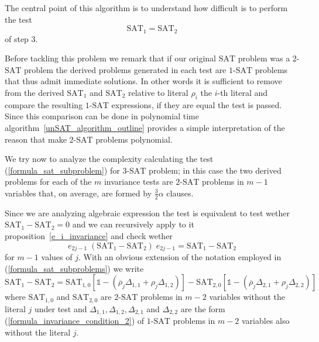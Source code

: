 \documentclass[a4paper,twoside,11pt]{article}
\begin{document}
The central point of this algorithm is to understand how difficult is to perform the test
\begin{equation}
\label{formula_sat_subproblem}
{\ensuremath{\mbox{SAT}}}_1 = {\ensuremath{\mbox{SAT}}}_2
\end{equation}
of step 3.

Before tackling this problem we remark that if our original {\ensuremath{\mbox{SAT}}}{} problem was a $2$-{\ensuremath{\mbox{SAT}}}{} problem the derived problems generated in each test are $1$-{\ensuremath{\mbox{SAT}}}{} problems that thus admit immediate solutions. In other words it is sufficient to remove from the derived ${\ensuremath{\mbox{SAT}}}_1$ and ${\ensuremath{\mbox{SAT}}}_2$ relative to literal ${\ensuremath{\rho}}_i$ the $i$-th literal and compare the resulting $1$-{\ensuremath{\mbox{SAT}}}{} expressions, if they are equal the test is passed. Since this comparison can be done in polynomial time algorithm~\ref{unSAT_algorithm_outline} provides a simple interpretation of the reason that make $2$-{\ensuremath{\mbox{SAT}}}{} problems polynomial.

\bigskip

We try now to analyze the complexity calculating the test (\ref{formula_sat_subproblem}) for $3$-{\ensuremath{\mbox{SAT}}}{} problem; in this case the two derived problems for each of the $m$ invariance tests are $2$-{\ensuremath{\mbox{SAT}}}{} problems in $m - 1$ variables that, on average, are formed by $\frac{3}{2} \alpha$ clauses.

Since we are analyzing algebraic expression the test is equivalent to test wether ${\ensuremath{\mbox{SAT}}}_1 - {\ensuremath{\mbox{SAT}}}_2 = 0$ and we can recursively apply to it proposition~\ref{e_i_invariance} and check wether
$$
{e}_{2 j - 1} \; ({\ensuremath{\mbox{SAT}}}_1 - {\ensuremath{\mbox{SAT}}}_2) \; {e}_{2 j - 1} = {\ensuremath{\mbox{SAT}}}_1 - {\ensuremath{\mbox{SAT}}}_2
$$
for $m - 1$ values of $j$. With an obvious extension of the notation employed in (\ref{formula_sat_subproblems}) we write
\begin{equation}
\label{formula_reduced_1}
{\ensuremath{\mbox{SAT}}}_1 - {\ensuremath{\mbox{SAT}}}_2 = {\ensuremath{\mbox{SAT}}}_{1,0} \left[{\ensuremath{\mathbb{1}}} - ({\overline{\ensuremath{\rho}}}_j \Delta_{1,1} + {\ensuremath{\rho}}_j \Delta_{1,2})\right] -  {\ensuremath{\mbox{SAT}}}_{2,0} \left[{\ensuremath{\mathbb{1}}} - ({\overline{\ensuremath{\rho}}}_j \Delta_{2,1} + {\ensuremath{\rho}}_j \Delta_{2,2})\right]
\end{equation}
where ${\ensuremath{\mbox{SAT}}}_{1,0}$ and ${\ensuremath{\mbox{SAT}}}_{2,0}$ are $2$-{\ensuremath{\mbox{SAT}}}{} problems in $m-2$ variables without the literal $j$ under test and $\Delta_{1,1}, \Delta_{1,2}, \Delta_{2,1}$ and $\Delta_{2,2}$ are the form (\ref{formula_invariance_condition_2}) of $1$-{\ensuremath{\mbox{SAT}}}{} problems in $m-2$ variables also without the literal $j$.
\end{document}
